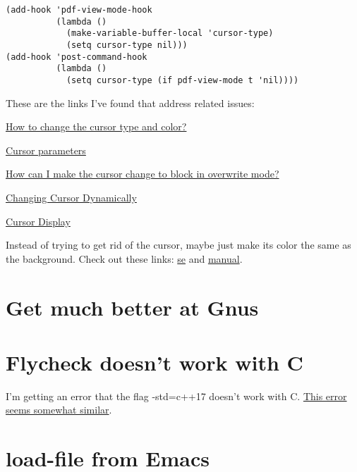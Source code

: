 \documentclass{default}
\begin{document}
\begin{verbatim}
(add-hook 'pdf-view-mode-hook
          (lambda ()
            (make-variable-buffer-local 'cursor-type)
            (setq cursor-type nil)))
(add-hook 'post-command-hook
          (lambda ()
            (setq cursor-type (if pdf-view-mode t 'nil))))
\end{verbatim}

These are the links I've found that address related issues:

\href{https://emacs.stackexchange.com/questions/392/how-to-change-the-cursor-type-and-color}{How to
  change the cursor type and color?}

\href{https://www.gnu.org/software/emacs/manual/html_node/elisp/Cursor-Parameters.html}{Cursor
  parameters}

\href{https://emacs.stackexchange.com/questions/44650/how-can-i-make-the-cursor-change-to-block-in-overwrite-mode?rq=1}{How
  can I make the cursor change to block in overwrite mode?}

\href{https://www.emacswiki.org/emacs/ChangingCursorDynamically}{Changing Cursor Dynamically}

\href{https://www.gnu.org/software/emacs/manual/html_node/emacs/Cursor-Display.html}{Cursor Display}

Instead of trying to get rid of the cursor, maybe just make its color the same as the
background. Check out these links:
\href{https://emacs.stackexchange.com/questions/7281/how-to-modify-face-for-a-specific-buffer}{se}
and \href{https://www.gnu.org/software/emacs/manual/html_node/elisp/Face-Remapping.html}{manual}.

\section{Get much better at Gnus}

\section{Flycheck doesn't work with C}

I'm getting an error that the flag -std=c++17 doesn't work with
C\@. \href{https://github.com/alexmurray/flycheck-clang-analyzer/issues/6}{This error seems somewhat
similar}.

\section{load-file from Emacs}
\end{document}
